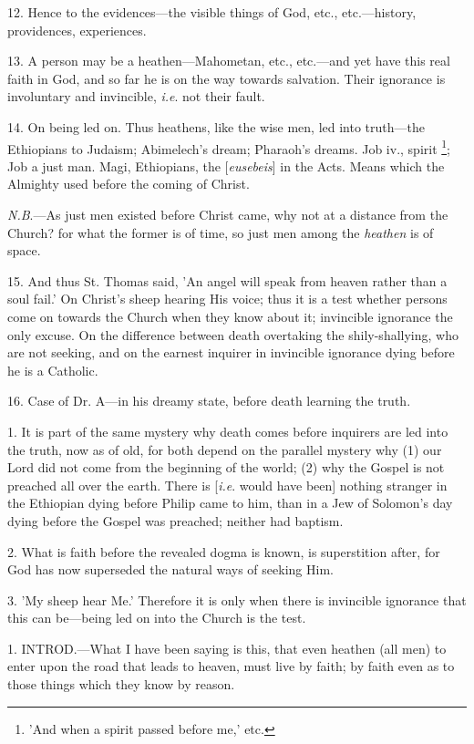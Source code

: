 12. Hence to the evidences—the visible things
of God, etc., etc.—history, providences, experiences.

13. A person may be a heathen—Mahometan, etc.,
etc.—and yet have this real faith in God, and so far he is on the
way towards salvation. Their ignorance is involuntary and invincible, \emph{i.e}.
not their fault.

14. On being led on. Thus heathens, like the wise
men, led into truth—the Ethiopians to Judaism; Abimelech's dream;
Pharaoh's dreams. Job iv., spirit \footnote{'And when a spirit
passed before me,' etc.}; Job a just man. Magi, Ethiopians, the [\emph{eusebeis}] in
the Acts. Means which the Almighty used before the coming of Christ.

\emph{N.B}.—As just men existed before Christ
came, why not at a distance from the Church? for what the former is of
time, so just men among the \emph{heathen} is of space.

15. And thus St. Thomas said, 'An angel will
speak from heaven rather than a soul fail.' On Christ's sheep hearing
His voice; thus it is a test whether persons come on towards the
Church when they know about it; invincible ignorance the only excuse.
On the difference between death overtaking the shily-shallying, who
are not seeking, and on the earnest inquirer in invincible ignorance
dying before he is a Catholic.

16. Case of Dr. A—in his dreamy state, before
death learning the truth.


1. It is part of the same mystery why death comes
before inquirers are led into the truth, now as of old, for both
depend on the parallel mystery why (1) our Lord did not come from the
beginning of the world; (2) why the Gospel is not preached all over
the earth. There is [\emph{i.e}. would have been] nothing stranger in
the Ethiopian dying before Philip came to him, than in a Jew of
Solomon's day dying before the Gospel was preached; neither had
baptism.

2. What is faith before the revealed dogma is
known, is superstition after, for God has now superseded the natural
ways of seeking Him.

3. 'My sheep hear Me.' Therefore it is only when
there is invincible ignorance that this can be—being led on into the
Church is the test.


1. INTROD.—What
I have been saying is this, that even heathen (all men) to enter upon
the road that leads to heaven, must live by faith; by faith even as to
those things which they know by reason.

